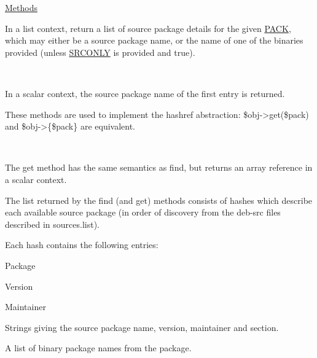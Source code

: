\documentclass[]{article}
\renewcommand{\emph}[1]{\underline{#1}}
\begin{document}
\emph{Methods}

\begin{description}
\itemsep1pt\parskip0pt
\item[find(\emph{PACK}, {[}\emph{SRCONLY}{]})]
In a list context, return a list of source package details for the given
\emph{PACK}, which may either be a source package name, or the name of
one of the binaries provided (unless \emph{SRCONLY} is provided and
true).

~

In a scalar context, the source package name of the first entry is
returned.
\end{description}

\begin{description}
\itemsep1pt\parskip0pt
\item[get, exists]
These methods are used to implement the hashref abstraction:
\$obj-\textgreater{}get(\$pack) and \$obj-\textgreater{}\{\$pack\} are
equivalent.

~

The get method has the same semantics as find, but returns an array
reference in a scalar context.
\end{description}

The list returned by the find (and get) methods consists of hashes which
describe each available source package (in order of discovery from the
deb-src files described in sources.list).

Each hash contains the following entries:

\begin{description}
\item[Package]
\end{description}

\begin{description}
\item[Version]
\end{description}

\begin{description}
\item[Maintainer]
\end{description}

\begin{description}
\itemsep1pt\parskip0pt
\item[Section]
Strings giving the source package name, version, maintainer and section.
\end{description}

\begin{description}
\itemsep1pt\parskip0pt
\item[Binaries]
A list of binary package names from the package.
\end{description}
\end{document}
